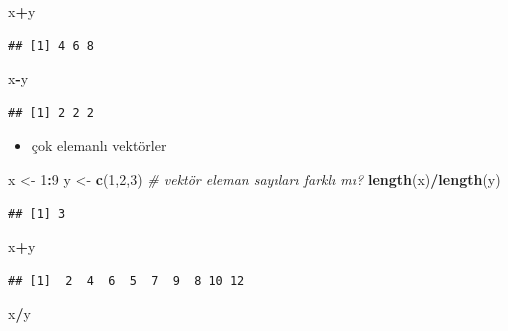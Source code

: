 \documentclass[
  oneside]{book}
\newenvironment{Shaded}{\begin{snugshade}}{\end{snugshade}}
\newcommand{\CommentTok}[1]{\textcolor[rgb]{0.56,0.35,0.01}{\textit{#1}}}
\newcommand{\DecValTok}[1]{\textcolor[rgb]{0.00,0.00,0.81}{#1}}
\newcommand{\FunctionTok}[1]{\textcolor[rgb]{0.13,0.29,0.53}{\textbf{#1}}}
\newcommand{\NormalTok}[1]{#1}
\newcommand{\OtherTok}[1]{\textcolor[rgb]{0.56,0.35,0.01}{#1}}
\newcommand{\SpecialCharTok}[1]{\textcolor[rgb]{0.81,0.36,0.00}{\textbf{#1}}}
\providecommand{\tightlist}{%
  \setlength{\itemsep}{0pt}\setlength{\parskip}{0pt}}
\begin{document}
\begin{Shaded}
\begin{Highlighting}[]
\NormalTok{x}\SpecialCharTok{+}\NormalTok{y}
\end{Highlighting}
\end{Shaded}

\begin{verbatim}
## [1] 4 6 8
\end{verbatim}

\begin{Shaded}
\begin{Highlighting}[]
\NormalTok{x}\SpecialCharTok{{-}}\NormalTok{y}
\end{Highlighting}
\end{Shaded}

\begin{verbatim}
## [1] 2 2 2
\end{verbatim}

\begin{itemize}
\tightlist
\item
  çok elemanlı vektörler
\end{itemize}

\begin{Shaded}
\begin{Highlighting}[]
\NormalTok{x }\OtherTok{\textless{}{-}} \DecValTok{1}\SpecialCharTok{:}\DecValTok{9}
\NormalTok{y }\OtherTok{\textless{}{-}} \FunctionTok{c}\NormalTok{(}\DecValTok{1}\NormalTok{,}\DecValTok{2}\NormalTok{,}\DecValTok{3}\NormalTok{)}
\CommentTok{\# vektör eleman sayıları farklı mı?}
\FunctionTok{length}\NormalTok{(x)}\SpecialCharTok{/}\FunctionTok{length}\NormalTok{(y)}
\end{Highlighting}
\end{Shaded}

\begin{verbatim}
## [1] 3
\end{verbatim}

\begin{Shaded}
\begin{Highlighting}[]
\NormalTok{x}\SpecialCharTok{+}\NormalTok{y}
\end{Highlighting}
\end{Shaded}

\begin{verbatim}
## [1]  2  4  6  5  7  9  8 10 12
\end{verbatim}

\begin{Shaded}
\begin{Highlighting}[]
\NormalTok{x}\SpecialCharTok{/}\NormalTok{y}
\end{Highlighting}
\end{Shaded}
\end{document}
